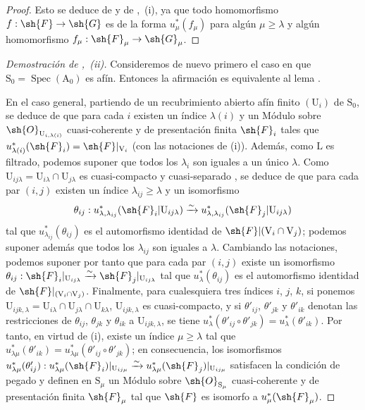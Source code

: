 \begin{proof}
Esto se deduce de  y de ,~(i), ya que todo homomorfismo $f:\sh{F}\to\sh{G}$ es de la forma $u_\mu^*(f_\mu)$ para algún $\mu\geqslant\lambda$ y algún homomorfismo $f_\mu:\sh{F}_\mu\to\sh{G}_\mu$.
\end{proof}

\begin{proof}[Demostración de ,~(ii)]
Consideremos de nuevo primero el caso en que $\mathrm{S}_0=\operatorname{Spec}(\mathrm{A}_0)$ es afín.
Entonces la afirmación es equivalente al lema .

En el caso general, partiendo de un recubrimiento abierto afín finito $(\mathrm{U}_i)$ de $\mathrm{S}_0$, se deduce de  que para cada $i$ existen un índice $\lambda(i)$ y un Módulo sobre $\sh{O}_{\mathrm{U}_{i,\lambda(i)}}$ cuasi-coherente y de presentación finita $\sh{F}_i$ tales que $u_{\lambda(i)}^*(\sh{F}_i)=\sh{F}|_{\mathrm{V}_i}$ (con las notaciones de (i)).
Además, como $\mathrm{L}$ es filtrado, podemos suponer que todos los $\lambda_i$ son iguales a un único $\lambda$.
Como $\mathrm{U}_{ij\lambda}=\mathrm{U}_{i\lambda}\cap\mathrm{U}_{j\lambda}$ es cuasi-compacto y cuasi-separado , se deduce de  que para cada par $(i,j)$ existen un índice $\lambda_{ij}\geqslant\lambda$ y un isomorfismo
\[
  \theta_{ij}:u_{\lambda,\lambda_{ij}}^*(\sh{F}_i|\mathrm{U}_{ij\lambda})\xrightarrow{\sim}u_{\lambda,\lambda_{ij}}^*(\sh{F}_j|\mathrm{U}_{ij\lambda})
\]
tal que $u_{\lambda_{ij}}^*(\theta_{ij})$ es el automorfismo identidad de $\sh{F}|(\mathrm{V}_i\cap\mathrm{V}_j)$; podemos suponer además que todos los $\lambda_{ij}$ son iguales a $\lambda$.
Cambiando las notaciones, podemos suponer por tanto que para cada par $(i,j)$ existe un isomorfismo $\theta_{ij}:\sh{F}_i|_{\mathrm{U}_{ij\lambda}}\xrightarrow{\sim}\sh{F}_j|_{\mathrm{U}_{ij\lambda}}$ tal que $u_\lambda^*(\theta_{ij})$ es el automorfismo identidad de $\sh{F}|_{(\mathrm{V}_i\cap\mathrm{V}_j)}$.
Finalmente, para cualesquiera tres índices $i$, $j$, $k$, si ponemos $\mathrm{U}_{ijk,\lambda}=\mathrm{U}_{i\lambda}\cap\mathrm{U}_{j\lambda}\cap\mathrm{U}_{k\lambda}$, $\mathrm{U}_{ijk,\lambda}$ es cuasi-compacto, y si $\theta'_{ij}$, $\theta'_{jk}$ y $\theta'_{ik}$ denotan las restricciones de $\theta_{ij}$, $\theta_{jk}$ y $\theta_{ik}$ a $\mathrm{U}_{ijk,\lambda}$, se tiene $u_\lambda^*(\theta'_{ij}\circ\theta'_{jk})=u_\lambda^*(\theta'_{ik})$.
Por tanto, en virtud de (i), existe un índice $\mu\geqslant\lambda$ tal que $u_{\lambda\mu}^*(\theta'_{ik})=u_{\lambda\mu}^*(\theta'_{ij}\circ\theta'_{jk})$; en consecuencia, los isomorfismos $u_{\lambda\mu}^*(\theta'_{ij}):u_{\lambda\mu}^*(\sh{F}_i)|_{\mathrm{U}_{ij\mu}}\xrightarrow{\sim}u_{\lambda\mu}^*(\sh{F}_j)|_{\mathrm{U}_{ij\mu}}$ satisfacen la condición de pegado y definen en $\mathrm{S}_\mu$ un Módulo sobre $\sh{O}_{\mathrm{S}_\mu}$ cuasi-coherente y de presentación finita $\sh{F}_\mu$  tal que $\sh{F}$ es isomorfo a $u_\mu^*(\sh{F}_\mu)$.
\end{proof}


